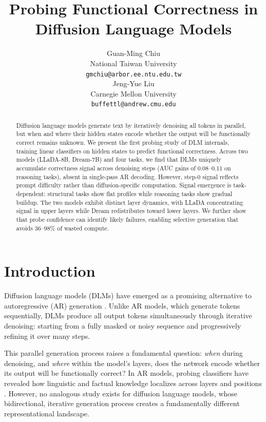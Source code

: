 \documentclass[11pt]{article}
\title{Probing Functional Correctness in Diffusion Language Models}
\author{Guan-Ming Chiu \\
  National Taiwan University \\
  \texttt{gmchiu@arbor.ee.ntu.edu.tw} \\\And
  Jeng-Yue Liu \\
  Carnegie Mellon University \\
  \texttt{buffettl@andrew.cmu.edu} \\}
\begin{document}
\maketitle

\begin{abstract}
Diffusion language models generate text by iteratively denoising all tokens in parallel, but when and where their hidden states encode whether the output will be functionally correct remains unknown.
We present the first probing study of DLM internals, training linear classifiers on hidden states to predict functional correctness.
Across two models (LLaDA-8B, Dream-7B) and four tasks, we find that DLMs uniquely accumulate correctness signal across denoising steps (AUC gains of 0.08--0.11 on reasoning tasks), absent in single-pass AR decoding. However, step-0 signal reflects prompt difficulty rather than diffusion-specific computation. Signal emergence is task-dependent: structural tasks show flat profiles while reasoning tasks show gradual buildup. The two models exhibit distinct layer dynamics, with LLaDA concentrating signal in upper layers while Dream redistributes toward lower layers. We further show that probe confidence can identify likely failures, enabling selective generation that avoids 36--98\% of wasted compute.
\end{abstract}

\section{Introduction}

Diffusion language models (DLMs) have emerged as a promising alternative to autoregressive (AR) generation \citep{austin2021d3pm,sahoo2024simple,lou2024discrete}.
Unlike AR models, which generate tokens sequentially, DLMs produce all output tokens simultaneously through iterative denoising: starting from a fully masked or noisy sequence and progressively refining it over many steps.

This parallel generation process raises a fundamental question: \emph{when} during denoising, and \emph{where} within the model's layers, does the network encode whether its output will be functionally correct?
In AR models, probing classifiers have revealed how linguistic and factual knowledge localizes across layers and positions \citep{tenney2019bert,geva2023dissecting,azaria2023internal}.
However, no analogous study exists for diffusion language models, whose bidirectional, iterative generation process creates a fundamentally different representational landscape.
\end{document}

